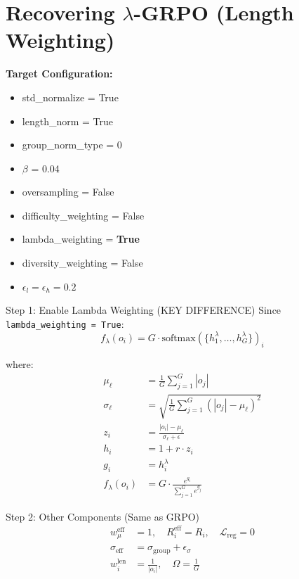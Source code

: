 \documentclass[11pt,a4paper]{article}
\begin{document}
\newpage

\section{Recovering $\lambda$-GRPO (Length Weighting)}

\begin{configbox}
\textbf{Target Configuration:}
\begin{itemize}[noitemsep]
    \item std\_normalize = True
    \item length\_norm = True
    \item group\_norm\_type = 0
    \item $\beta$ = 0.04
    \item oversampling = False
    \item difficulty\_weighting = False
    \item lambda\_weighting = \textbf{True}
    \item diversity\_weighting = False
    \item $\epsilon_l = \epsilon_h = 0.2$
\end{itemize}
\end{configbox}

\begin{proofbox}{Step 1: Enable Lambda Weighting (KEY DIFFERENCE)}
Since \texttt{lambda\_weighting = True}:
\begin{equation}
f_\lambda(o_i) = G \cdot \text{softmax}(\{h_1^\lambda, \ldots, h_G^\lambda\})_i
\end{equation}

where:
\begin{align}
\mu_\ell &= \frac{1}{G}\sum_{j=1}^G |o_j| \\
\sigma_\ell &= \sqrt{\frac{1}{G}\sum_{j=1}^G (|o_j| - \mu_\ell)^2} \\
z_i &= \frac{|o_i| - \mu_\ell}{\sigma_\ell + \epsilon} \\
h_i &= 1 + r \cdot z_i \\
g_i &= h_i^\lambda \\
f_\lambda(o_i) &= G \cdot \frac{e^{g_i}}{\sum_{j=1}^G e^{g_j}}
\end{align}
\end{proofbox}

\begin{proofbox}{Step 2: Other Components (Same as GRPO)}
\begin{align}
w_\mu^{\text{eff}} &= 1, \quad R_i^{\text{eff}} = R_i, \quad \mathcal{L}_{\text{reg}} = 0 \\
\sigma_{\text{eff}} &= \sigma_{\text{group}} + \epsilon_\sigma \\
w_i^{\text{len}} &= \frac{1}{|o_i|}, \quad \Omega = \frac{1}{G}
\end{align}
\end{proofbox}
\end{document}
